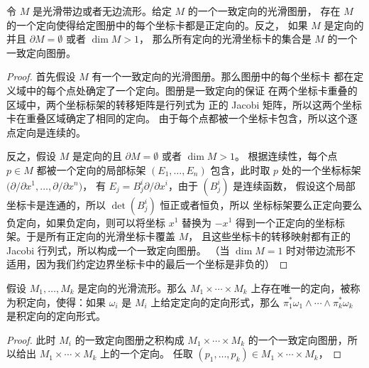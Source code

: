 \begin{proposition}[通过坐标图册确定的定向]
  令 $M$ 是光滑带边或者无边流形。给定 $M$ 的一个一致定向的光滑图册，
  存在 $M$ 的一个定向使得给定图册中的每个坐标卡都是正定向的。反之，
  如果 $M$ 是定向的并且 $\partial M=\emptyset$ 或者 $\dim M>1$，
  那么所有定向的光滑坐标卡的集合是 $M$ 的一个一致定向图册。
\end{proposition}
\begin{proof}
  首先假设 $M$ 有一个一致定向的光滑图册。那么图册中的每个坐标卡
  都在定义域中的每个点处确定了一个定向。图册是一致定向的保证
  在两个坐标卡重叠的区域中，两个坐标标架的转移矩阵是行列式为
  正的 Jacobi 矩阵，所以这两个坐标卡在重叠区域确定了相同的定向。
  由于每个点都被一个坐标卡包含，所以这个逐点定向是连续的。

  反之，假设 $M$ 是定向的且 $\partial M=\emptyset$ 或者 $\dim M>1$。
  根据连续性，每个点 $p\in M$ 都被一个定向的局部标架 $(E_1,\dots,E_n)$
  包含，此时取 $p$ 处的一个坐标标架 $\bigl(\partial/\partial x^1,\dots,\partial/\partial x^n\bigr)$，
  有 $E_j=B^i_j\partial/\partial x^i$，由于 $(B_j^i)$ 是连续函数，
  假设这个局部坐标卡是连通的，所以 $\det(B_j^i)$ 恒正或者恒负，所以
  坐标标架要么正定向要么负定向，如果负定向，则可以将坐标 $x^1$ 替换为 
  $-x^1$ 得到一个正定向的坐标标架。于是所有正定向的光滑坐标卡覆盖 $M$，
  且这些坐标卡的转移映射都有正的 Jacobi 行列式，所以构成一个一致定向图册。
  （当 $\dim M=1$ 时对带边流形不适用，因为我们约定边界坐标卡中的最后一个坐标是非负的）
\end{proof}

\begin{proposition}[积定向]
  假设 $M_1,\dots,M_k$ 是定向的光滑流形。那么 $M_1\times\cdots\times M_k$
  上存在唯一的定向，被称为积定向，使得：如果 $\omega_i$ 是 $M_i$ 上给定定向的定向形式，那么
  $\pi_1^*\omega_1\wedge\cdots\wedge\pi_k^*\omega_k$ 是积定向的定向形式。
\end{proposition}
\begin{proof}
  此时 $M_i$ 的一致定向图册之积构成 $M_1\times\cdots\times M_k$
  的一个一致定向图册，所以给出 $M_1\times\cdots\times M_k$ 上的一个定向。
  任取 $(p_1,\dots,p_k)\in M_1\times\cdots\times M_k$，
\end{proof}

